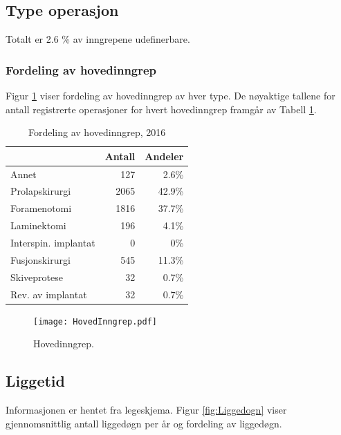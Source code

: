 \documentclass [norsk,a4paper,twoside]{article}\usepackage[]{graphicx}\usepackage[]{color}
\begin{document}
\subsection{Type operasjon}

Totalt er 2.6 \% 
av inngrepene udefinerbare. 



\subsubsection{Fordeling av hovedinngrep}

Figur \ref{fig:HovedInngrep} viser fordeling av hovedinngrep av hver type.
De nøyaktige tallene for antall registrerte operasjoner for hvert hovedinngrep 
framgår av Tabell \ref{tab:AntHovedInngrep}. 

\begin{table}[ht]
\centering
\begin{tabular}{lrr}
  \hline
 & Antall & Andeler \\ 
  \hline
Annet & 127 & 2.6\% \\ 
  Prolapskirurgi & 2065 & 42.9\% \\ 
  Foramenotomi & 1816 & 37.7\% \\ 
  Laminektomi & 196 & 4.1\% \\ 
  Interspin. implantat & 0 & 0\% \\ 
  Fusjonskirurgi & 545 & 11.3\% \\ 
  Skiveprotese & 32 & 0.7\% \\ 
  Rev. av implantat & 32 & 0.7\% \\ 
   \hline
\end{tabular}
\caption{Fordeling av hovedinngrep, 2016} 
\label{tab:AntHovedInngrep}
\end{table}



\begin{figure}[ht]
	\centering \texttt{[image: HovedInngrep.pdf]}
	\caption{\label{fig:HovedInngrep} Hovedinngrep.}
\end{figure}





\subsection{Liggetid}

Informasjonen er hentet fra legeskjema.
Figur \ref{fig:Liggedogn} viser gjennomsnittlig antall liggedøgn per år og fordeling av liggedøgn. 
\end{document}
